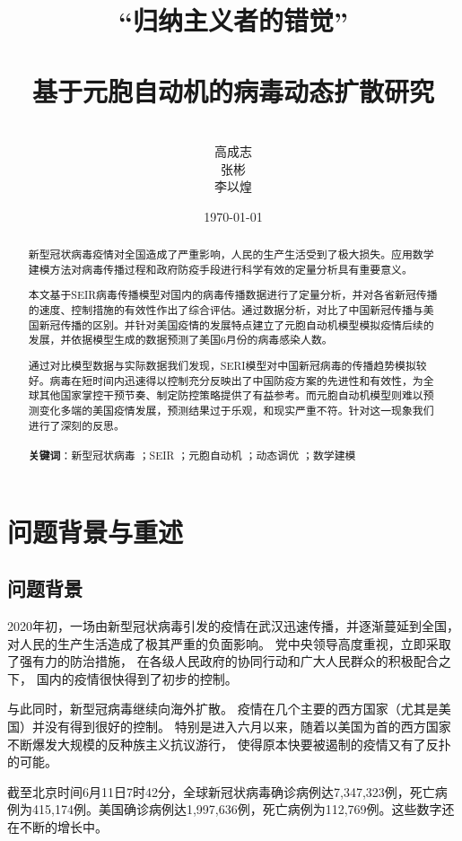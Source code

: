 \documentclass[UTF8]{ctexart}
\title{“归纳主义者的错觉” \\ \hspace*{\fill} \\ 基于元胞自动机的病毒动态扩散研究}
\author{\\高成志\\ 张彬 \\李以煌}
\date{\today}
\begin{document}
\maketitle

\newpage
\begin{abstract}
    \par 
    新型冠状病毒疫情对全国造成了严重影响，人民的生产生活受到了极大损失。应用数学建模方法对病毒传播过程和政府防疫手段进行科学有效的定量分析具有重要意义。
    \par 
    本文基于SEIR病毒传播模型对国内的病毒传播数据进行了定量分析，并对各省新冠传播的速度、控制措施的有效性作出了综合评估。通过数据分析，对比了中国新冠传播与美国新冠传播的区别。并针对美国疫情的发展特点建立了元胞自动机模型模拟疫情后续的发展，并依据模型生成的数据预测了美国6月份的病毒感染人数。
    \par 
    通过对比模型数据与实际数据我们发现，SERI模型对中国新冠病毒的传播趋势模拟较好。病毒在短时间内迅速得以控制充分反映出了中国防疫方案的先进性和有效性，为全球其他国家掌控干预节奏、制定防控策略提供了有益参考。而元胞自动机模型则难以预测变化多端的美国疫情发展，预测结果过于乐观，和现实严重不符。针对这一现象我们进行了深刻的反思。
    \\ \hspace*{\fill} \\  
    \textbf{关键词}：新型冠状病毒 ；SEIR ；元胞自动机 ；动态调优 ；数学建模
\end{abstract}
\newpage

\tableofcontents

\newpage
\section{问题背景与重述}
\subsection{问题背景} %
\label{sub:问题背景}
2020年初，一场由新型冠状病毒引发的疫情在武汉迅速传播，并逐渐蔓延到全国，
对人民的生产生活造成了极其严重的负面影响。
党中央领导高度重视，立即采取了强有力的防治措施，
在各级人民政府的协同行动和广大人民群众的积极配合之下，
国内的疫情很快得到了初步的控制。
\par
与此同时，新型冠病毒继续向海外扩散。
疫情在几个主要的西方国家（尤其是美国）并没有得到很好的控制。
特别是进入六月以来，随着以美国为首的西方国家不断爆发大规模的反种族主义抗议游行，
使得原本快要被遏制的疫情又有了反扑的可能。
\par
截至北京时间6月11日7时42分，全球新冠状病毒确诊病例达7,347,323例，死亡病例为415,174例。美国确诊病例达1,997,636例，死亡病例为112,769例。这些数字还在不断的增长中。
\end{document}
